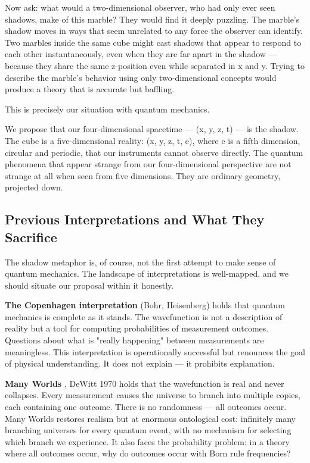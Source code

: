 \documentclass[aps,prd,preprint,superscriptaddress,longbibliography,floatfix]{revtex4-2}
\theoremstyle{remark}
\begin{document}
Now ask: what would a two-dimensional observer, who had only ever seen shadows, make of this marble? They would find it deeply puzzling. The marble's shadow moves in ways that seem unrelated to any force the observer can identify. Two marbles inside the same cube might cast shadows that appear to respond to each other instantaneously, even when they are far apart in the shadow --- because they share the same z-position even while separated in x and y. Trying to describe the marble's behavior using only two-dimensional concepts would produce a theory that is accurate but baffling.

This is precisely our situation with quantum mechanics.

We propose that our four-dimensional spacetime --- (x, y, z, t) --- is the shadow. The cube is a five-dimensional reality: (x, y, z, t, e), where e is a fifth dimension, circular and periodic, that our instruments cannot observe directly. The quantum phenomena that appear strange from our four-dimensional perspective are not strange at all when seen from five dimensions. They are ordinary geometry, projected down.



\subsection{Previous Interpretations and What They Sacrifice}

The shadow metaphor is, of course, not the first attempt to make sense of quantum mechanics. The landscape of interpretations is well-mapped, and we should situate our proposal within it honestly.

\textbf{The Copenhagen interpretation} (Bohr, Heisenberg) holds that quantum mechanics is complete as it stands. The wavefunction is not a description of reality but a tool for computing probabilities of measurement outcomes. Questions about what is "really happening" between measurements are meaningless. This interpretation is operationally successful but renounces the goal of physical understanding. It does not explain --- it prohibits explanation.

\textbf{Many Worlds} \cite{Everett1957}, DeWitt 1970 holds that the wavefunction is real and never collapses. Every measurement causes the universe to branch into multiple copies, each containing one outcome. There is no randomness --- all outcomes occur. Many Worlds restores realism but at enormous ontological cost: infinitely many branching universes for every quantum event, with no mechanism for selecting which branch we experience. It also faces the probability problem: in a theory where all outcomes occur, why do outcomes occur with Born rule frequencies?
\end{document}
